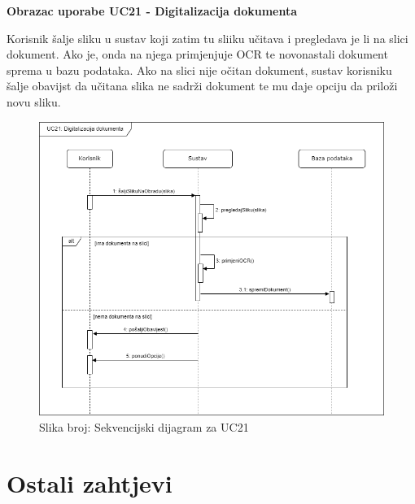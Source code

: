 				\textbf{Obrazac uporabe UC21 - Digitalizacija dokumenta}\
				
				Korisnik šalje sliku  u sustav koji zatim tu sliiku učitava i pregledava je li na slici dokument. Ako je, onda na njega primjenjuje OCR te novonastali dokument sprema u bazu podataka. Ako na slici nije očitan dokument, sustav korisniku šalje obavijst da učitana slika ne sadrži dokument te mu daje opciju da priloži novu sliku.
				\begin{figure}[H]
					\includegraphics[width=\textwidth]{slike/sekvencijski_dijagram_UC21.PNG} %
					\caption{Slika broj: Sekvencijski dijagram za UC21}
					\label{fig:UC21} %
				\end{figure}		
				\clearpage

				\eject
	
		\section{Ostali zahtjevi}

